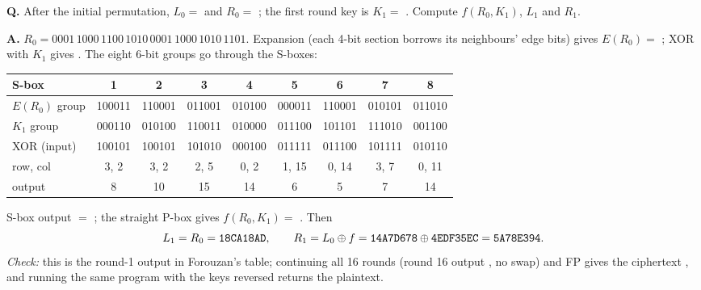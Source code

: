 \begin{worked}[: one full DES round (Forouzan's trace: $P = $ \ttx{123456ABCD132536}, key \ttx{AABB09182736CCDD})]
\textbf{Q.} After the initial permutation, $L_0 = $  and $R_0 = $ ; the first round key is $K_1 = $ . Compute $f(R_0, K_1)$, $L_1$ and $R_1$.

\textbf{A.} $R_0 = 0001\,1000\,1100\,1010\,0001\,1000\,1010\,1101$. Expansion (each 4-bit section borrows its neighbours' edge bits) gives $E(R_0) = $ ; XOR with $K_1$ gives . The eight 6-bit groups go through the S-boxes:
\begin{center}\small\setlength{\tabcolsep}{4pt}
\begin{tabular}{@{}lcccccccc@{}}
\toprule
S-box & 1 & 2 & 3 & 4 & 5 & 6 & 7 & 8\\
\midrule
$E(R_0)$ group & 100011 & 110001 & 011001 & 010100 & 000011 & 110001 & 010101 & 011010\\
$K_1$ group & 000110 & 010100 & 110011 & 010000 & 011100 & 101101 & 111010 & 001100\\
XOR (input) & 100101 & 100101 & 101010 & 000100 & 011111 & 011100 & 101111 & 010110\\
row, col & 3, 2 & 3, 2 & 2, 5 & 0, 2 & 1, 15 & 0, 14 & 3, 7 & 0, 11\\
output & 8 & 10 & 15 & 14 & 6 & 5 & 7 & 14\\
\bottomrule
\end{tabular}
\end{center}
S-box output $= $ ; the straight P-box gives $f(R_0, K_1) = $ . Then
\[
L_1 = R_0 = \texttt{18CA18AD}, \qquad R_1 = L_0 \oplus f = \texttt{14A7D678} \oplus \texttt{4EDF35EC} = \texttt{5A78E394}.
\]
\emph{Check:} this is the round-1 output in Forouzan's table; continuing all 16 rounds (round 16 output , no swap) and FP gives the ciphertext , and running the same program with the keys reversed returns the plaintext.
\end{worked}

